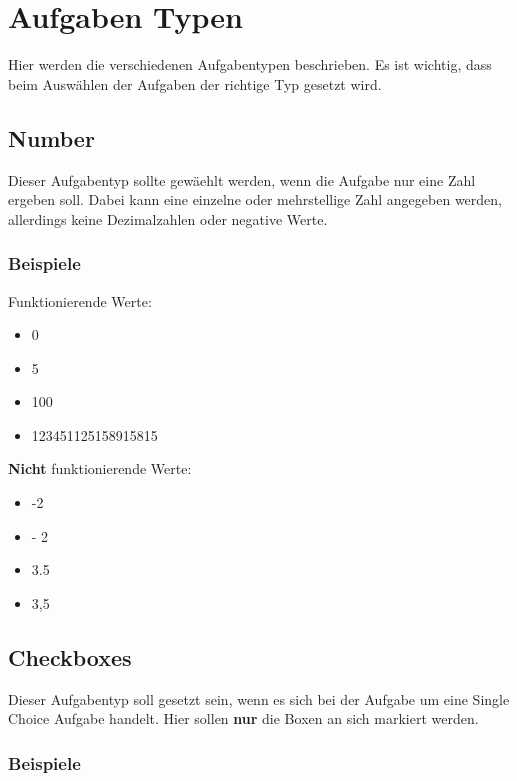 \author{Tadd\"aus Nauheimer}
\chapter{Aufgaben Typen}

Hier werden die verschiedenen Aufgabentypen beschrieben.
Es ist wichtig, dass beim Ausw\"ahlen der Aufgaben der richtige Typ gesetzt wird.

\section{Number}

Dieser Aufgabentyp sollte gew\"aehlt werden, wenn die Aufgabe nur eine Zahl ergeben soll. 
Dabei kann eine einzelne oder mehrstellige Zahl angegeben werden, allerdings keine Dezimalzahlen oder negative Werte.

\subsection{Beispiele}

Funktionierende Werte:

\begin{itemize}
	\item 0
	\item 5
	\item 100
	\item 123451125158915815
\end{itemize}

\textbf{Nicht} funktionierende Werte:

\begin{itemize}
	\item -2
	\item - 2
	\item 3.5
	\item 3,5
\end{itemize}

\section{Checkboxes}

Dieser Aufgabentyp soll gesetzt sein, wenn es sich bei der Aufgabe um eine Single Choice Aufgabe handelt.
Hier sollen \textbf{nur} die Boxen an sich markiert werden.

\subsection{Beispiele}

